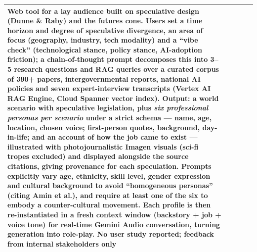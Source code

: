 \begin{table}[t]
\begin{tabular}{p{0.5cm} p{3.6cm} p{3.4cm} p{3.6cm} p{3.6cm}}
Web tool for a lay audience built on speculative design (Dunne \& Raby) and the futures cone. Users set a time horizon and degree of speculative divergence, an area of focus (geography, industry, tech modality) and a ``vibe check'' (technological stance, policy stance, AI-adoption friction); a chain-of-thought prompt decomposes this into 3--5 research questions and RAG queries over a curated corpus of 390+ papers, intergovernmental reports, national AI policies and seven expert-interview transcripts (Vertex AI RAG Engine, Cloud Spanner vector index). Output: a world scenario with speculative legislation, plus \emph{six professional personas per scenario} under a strict schema --- name, age, location, chosen voice; first-person quotes, background, day-in-life; and an account of how the job came to exist --- illustrated with photojournalistic Imagen visuals (sci-fi tropes excluded) and displayed alongside the source citations, giving provenance for each speculation. Prompts explicitly vary age, ethnicity, skill level, gender expression and cultural background to avoid ``homogeneous personas'' (citing Amin et al.), and require at least one of the six to embody a counter-cultural movement. Each profile is then re-instantiated in a fresh context window (backstory + job + voice tone) for real-time Gemini Audio conversation, turning generation into role-play. No user study reported; feedback from internal stakeholders only \\
\bottomrule
\end{tabular}
\end{table}
